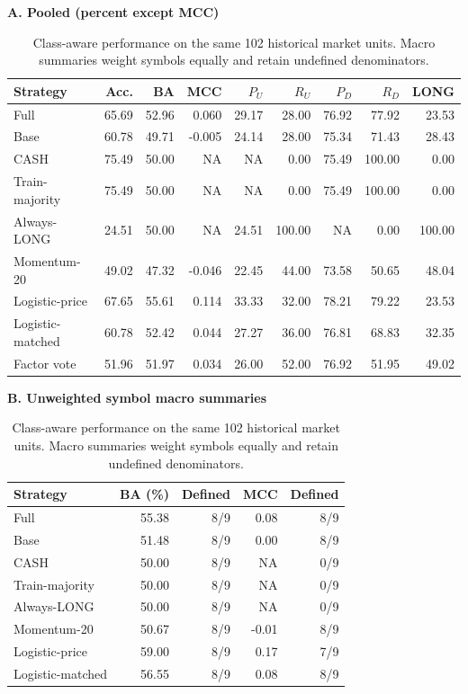 \begin{table}[!htbp]
\centering\small
\setlength{\tabcolsep}{3pt}
\renewcommand{\arraystretch}{1.15}
\caption{Class-aware performance on the same 102 historical market units. Macro summaries weight symbols equally and retain undefined denominators.}
\label{tab:classification}
\textbf{A. Pooled (percent except MCC)}\par\smallskip
\begin{tabular}{lrrrrrrrr}
\hline
Strategy & Acc. & BA & MCC & $P_U$ & $R_U$ & $P_D$ & $R_D$ & LONG \\
\hline
Full & 65.69 & 52.96 & 0.060 & 29.17 & 28.00 & 76.92 & 77.92 & 23.53 \\
Base & 60.78 & 49.71 & -0.005 & 24.14 & 28.00 & 75.34 & 71.43 & 28.43 \\
CASH & 75.49 & 50.00 & NA & NA & 0.00 & 75.49 & 100.00 & 0.00 \\
Train-majority & 75.49 & 50.00 & NA & NA & 0.00 & 75.49 & 100.00 & 0.00 \\
Always-LONG & 24.51 & 50.00 & NA & 24.51 & 100.00 & NA & 0.00 & 100.00 \\
Momentum-20 & 49.02 & 47.32 & -0.046 & 22.45 & 44.00 & 73.58 & 50.65 & 48.04 \\
Logistic-price & 67.65 & 55.61 & 0.114 & 33.33 & 32.00 & 78.21 & 79.22 & 23.53 \\
Logistic-matched & 60.78 & 52.42 & 0.044 & 27.27 & 36.00 & 76.81 & 68.83 & 32.35 \\
Factor vote & 51.96 & 51.97 & 0.034 & 26.00 & 52.00 & 76.92 & 51.95 & 49.02 \\
\hline
\end{tabular}\par\medskip
\textbf{B. Unweighted symbol macro summaries}\par\smallskip
\begin{tabular}{lrrrr}
\hline
Strategy & BA (\%) & Defined & MCC & Defined \\
\hline
Full & 55.38 & 8/9 & 0.08 & 8/9 \\
Base & 51.48 & 8/9 & 0.00 & 8/9 \\
CASH & 50.00 & 8/9 & NA & 0/9 \\
Train-majority & 50.00 & 8/9 & NA & 0/9 \\
Always-LONG & 50.00 & 8/9 & NA & 0/9 \\
Momentum-20 & 50.67 & 8/9 & -0.01 & 8/9 \\
Logistic-price & 59.00 & 8/9 & 0.17 & 7/9 \\
Logistic-matched & 56.55 & 8/9 & 0.08 & 8/9 \\

\end{tabular}
\end{table}
